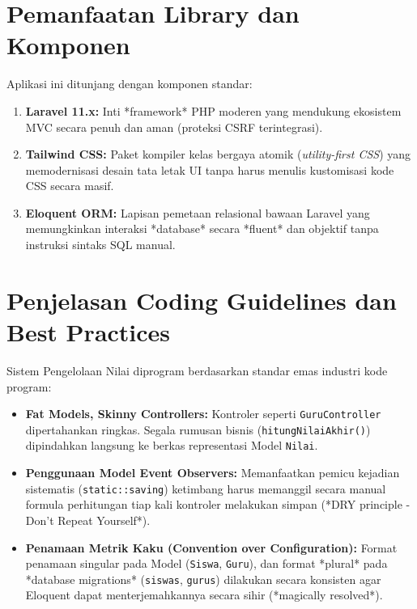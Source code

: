 \documentclass[12pt, a4paper]{article}
\begin{document}
\section{Pemanfaatan Library dan Komponen}
Aplikasi ini ditunjang dengan komponen standar:
\begin{enumerate}
    \item \textbf{Laravel 11.x:} Inti *framework* PHP moderen yang mendukung ekosistem MVC secara penuh dan aman (proteksi CSRF terintegrasi).
    \item \textbf{Tailwind CSS:} Paket kompiler kelas bergaya atomik (\textit{utility-first CSS}) yang memodernisasi desain tata letak UI tanpa harus menulis kustomisasi kode CSS secara masif.
    \item \textbf{Eloquent ORM:} Lapisan pemetaan relasional bawaan Laravel yang memungkinkan interaksi *database* secara *fluent* dan objektif tanpa instruksi sintaks SQL manual.
\end{enumerate}

\section{Penjelasan Coding Guidelines dan Best Practices}
Sistem Pengelolaan Nilai diprogram berdasarkan standar emas industri kode program:
\begin{itemize}
    \item \textbf{Fat Models, Skinny Controllers:} Kontroler seperti \texttt{GuruController} dipertahankan ringkas. Segala rumusan bisnis (\texttt{hitungNilaiAkhir()}) dipindahkan langsung ke berkas representasi Model \texttt{Nilai}.
    \item \textbf{Penggunaan Model Event Observers:} Memanfaatkan pemicu kejadian sistematis (\texttt{static::saving}) ketimbang harus memanggil secara manual formula perhitungan tiap kali kontroler melakukan simpan (*DRY principle - Don't Repeat Yourself*).
    \item \textbf{Penamaan Metrik Kaku (Convention over Configuration):} Format penamaan singular pada Model (\texttt{Siswa}, \texttt{Guru}), dan format *plural* pada *database migrations* (\texttt{siswas}, \texttt{gurus}) dilakukan secara konsisten agar Eloquent dapat menterjemahkannya secara sihir (*magically resolved*).
\end{itemize}
\end{document}
